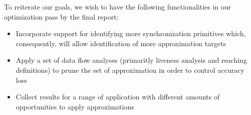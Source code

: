 \documentclass[12pt,conference]{IEEEtran}
\begin{document}
To reiterate our goals, we wish to have the following functionalities in
our optimization pass by the final report:
\begin{itemize}
\item Incorporate support for identifying more synchronization primitives
which, consequently, will allow identification of more approximation targets
\item Apply a set of data flow analyses (primaritly liveness analysis and 
reaching definitions) to prune the set of approximation in order to control
accuracy loss
\item Collect results for a range of application with different amounts of 
opportunities to apply approximations
\end{itemize}


%
%
%
\end{document}
